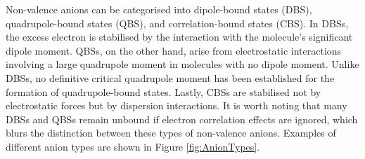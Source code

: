 Non-valence anions can be categorised into dipole-bound states (DBS)\cite{fermi1947capture,desfranccois1996abdoul,gutowski1996contribution,jordan2003theory,qian2019probing}, quadrupole-bound states (QBS)\cite{jordan1979binding,desfranccois2004long,sommerfeld2014excess}, and correlation-bound states (CBS)\cite{sommerfeld2010correlation,voora2013existence,voora2014nonvalence,voora2017theoretical}.
In DBSs, the excess electron is stabilised by the interaction with the molecule's significant dipole moment. QBSs, on the other hand, arise from electrostatic interactions involving a large quadrupole moment in molecules with no dipole moment. Unlike DBSs, no definitive critical quadrupole moment has been established for the formation of quadrupole-bound states\cite{sommerfeld2014excess}. Lastly, CBSs are stabilised not by electrostatic forces but by dispersion interactions. It is worth noting that many DBSs and QBSs remain unbound if electron correlation effects are ignored, which blurs the distinction between these types of non-valence anions\cite{voora2017theoretical}. Examples of different anion types are shown in Figure \ref{fig:AnionTypes}.

